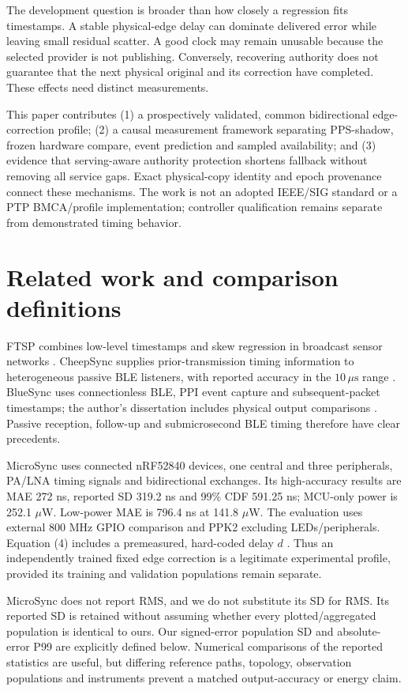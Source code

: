 \documentclass[11pt,letterpaper]{article}
\newcommand{\us}{\,\mu\mathrm{s}}
\newcommand{\page}{\clearpage}
\begin{document}
The development question is broader than how closely a regression fits timestamps. A stable physical-edge delay can dominate delivered error while leaving small residual scatter. A good clock may remain unusable because the selected provider is not publishing. Conversely, recovering authority does not guarantee that the next physical original and its correction have completed. These effects need distinct measurements.

This paper contributes (1) a prospectively validated, common bidirectional edge-correction profile; (2) a causal measurement framework separating PPS-shadow, frozen hardware compare, event prediction and sampled availability; and (3) evidence that serving-aware authority protection shortens fallback without removing all service gaps. Exact physical-copy identity and epoch provenance connect these mechanisms. The work is not an adopted IEEE/SIG standard or a PTP BMCA/profile implementation; controller qualification remains separate from demonstrated timing behavior.
\page
\section{Related work and comparison definitions}
FTSP combines low-level timestamps and skew regression in broadcast sensor networks \cite{ftsp}. CheepSync supplies prior-transmission timing information to heterogeneous passive BLE listeners, with reported accuracy in the $10\us$ range \cite{cheep}. BlueSync uses connectionless BLE, PPI event capture and subsequent-packet timestamps; the author's dissertation includes physical output comparisons \cite{blue}. Passive reception, follow-up and submicrosecond BLE timing therefore have clear precedents.

MicroSync uses connected nRF52840 devices, one central and three peripherals, PA/LNA timing signals and bidirectional exchanges. Its high-accuracy results are MAE 272 ns, reported SD 319.2 ns and 99\% CDF 591.25 ns; MCU-only power is 252.1 $\mu$W. Low-power MAE is 796.4 ns at 141.8 $\mu$W. The evaluation uses external 800 MHz GPIO comparison and PPK2 excluding LEDs/peripherals. Equation (4) includes a premeasured, hard-coded delay $d$ \cite{micro}. Thus an independently trained fixed edge correction is a legitimate experimental profile, provided its training and validation populations remain separate.

MicroSync does not report RMS, and we do not substitute its SD for RMS. Its reported SD is retained without assuming whether every plotted/aggregated population is identical to ours. Our signed-error population SD and absolute-error P99 are explicitly defined below. Numerical comparisons of the reported statistics are useful, but differing reference paths, topology, observation populations and instruments prevent a matched output-accuracy or energy claim.
\end{document}
